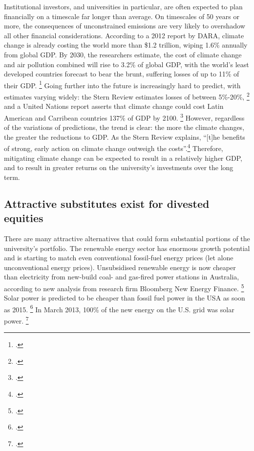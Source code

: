 Institutional investors, and universities in particular, are often expected to plan financially on a timescale far longer than average. 
On timescales of 50 years or more, the consequences of unconstrained emissions are very likely to overshadow all other financial considerations.
According to a 2012 report by DARA, climate change is already costing the world more than \$1.2 trillion, wiping 1.6\% annually from global GDP.
By 2030, the researchers estimate, the cost of climate change and air pollution combined will rise to 3.2\% of global GDP, with the world's least developed countries forecast to bear the brunt, suffering losses of up to 11\% of their GDP. \footcite{DARACVM}
Going further into the future is increasingly hard to predict, with estimates varying widely: the Stern Review estimates losses of between 5\%-20\%, \footcite{Stern2007} and a United Nations report asserts that climate change could cost Latin American and Carribean countries 137\% of GDP by 2100. \footcite{CCLatinAmerica}
However, regardless of the variations of predictions, the trend is clear: the more the climate changes, the greater the reductions to GDP.
As the Stern Review explains, ``[t]he benefits of strong, early action on climate change outweigh the costs''.\footcite[][Executive summary at: \url{http://www.hm-treasury.gov.uk/d/Executive_Summary.pdf}]{Stern2007}
Therefore, mitigating climate change can be expected to result in a relatively higher GDP, and to result in greater returns on the university's investments over the long term.



	\subsection {Attractive substitutes exist for divested equities}



There are many attractive alternatives that could form substantial portions of the university's portfolio.
The renewable energy sector has enormous growth potential and is starting to match even conventional fossil-fuel energy prices (let alone unconventional energy prices).
Unsubsidised renewable energy is now cheaper than electricity from new-build coal- and gas-fired power stations in Australia, according to new analysis from research firm Bloomberg New Energy Finance. \footcite{BlombergAussieWind}
Solar power is predicted to be cheaper than fossil fuel power in the USA as soon as 2015. \footcite{GlobalDataSolar}
In March 2013, 100\% of the new energy on the U.S. grid was solar power. \footcite{SmartPlanetSolar100}



